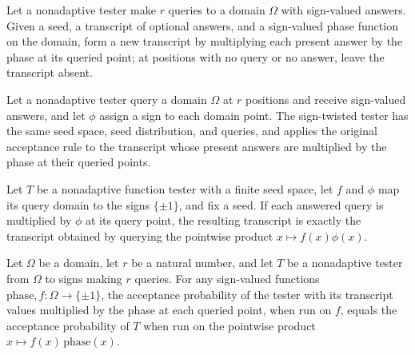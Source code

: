 \begin{definition}
\label{FABL.signTwistTranscript}
\leanok
{}
Let a nonadaptive tester make $r$ queries to a domain $\Omega$ with sign-valued answers.
Given a seed, a transcript of optional answers, and a sign-valued phase function on the
domain, form a new transcript by multiplying each present answer by the phase at its
queried point; at positions with no query or no answer, leave the transcript absent.
\end{definition}

\begin{definition}
\label{FABL.signTwistFunctionTester}
\leanok
{}
Let a nonadaptive tester query a domain $\Omega$ at $r$ positions and receive
sign-valued answers, and let $\phi$ assign a sign to each domain point. The
sign-twisted tester has the same seed space, seed distribution, and queries, and applies
the original acceptance rule to the transcript whose present answers are multiplied by
the phase at their queried points.
\end{definition}

\begin{theorem}
\label{FABL.signTwistTranscript_transcript}
\leanok
{}
Let $T$ be a nonadaptive function tester with a finite seed space, let $f$ and $\phi$
map its query domain to the signs $\{\pm1\}$, and fix a seed. If each answered query is
multiplied by $\phi$ at its query point, the resulting transcript is exactly the
transcript obtained by querying the pointwise product $x\mapsto f(x)\phi(x)$.
\end{theorem}

\begin{theorem}
\label{FABL.signTwistFunctionTester_acceptanceProbability}
\leanok
{}
Let $\Omega$ be a domain, let $r$ be a natural number, and let $T$ be a nonadaptive
tester from $\Omega$ to signs making $r$ queries. For any sign-valued functions
$\mathrm{phase},f:\Omega\to\{\pm1\}$, the acceptance probability of the tester with its
transcript values multiplied by the phase at each queried point, when run on $f$, equals
the acceptance probability of $T$ when run on the pointwise product $x\mapsto
f(x)\,\mathrm{phase}(x)$.
\end{theorem}

